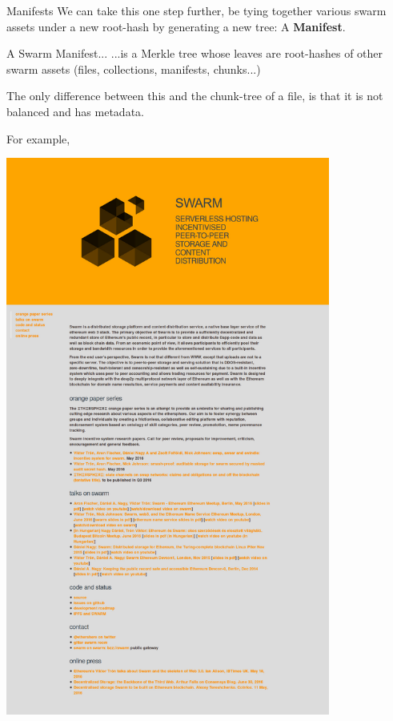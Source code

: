 \begin{frame}{Manifests}
 We can take this one step further, be tying together various swarm assets under a new root-hash by generating a new tree: A \textbf{Manifest}.\\
 \begin{block}{A Swarm Manifest...}
  ...is a Merkle tree whose leaves are root-hashes of other swarm assets (files, collections, manifests, chunks...)
 \end{block}
 The only difference between this and the chunk-tree of a file, is that it is not balanced and has metadata.
\end{frame}

\begin{frame}
 For example, 
 \end{frame}

\begin{frame}
 \includegraphics[width=0.8\textwidth]{devcon-swarmsite.pdf}
\end{frame}

